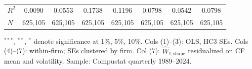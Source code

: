 \begin{table}[htbp]
{\begin{threeparttable}
\begin{tabular}{lccccccc}
$R^2$ & 0.0090 & 0.0553 & 0.1738 & 0.1196 & 0.0798 & 0.0542 & 0.0798 \\
$N$ & 625,105 & 625,105 & 625,105 & 625,105 & 625,105 & 625,105 & 625,105 \\
\bottomrule
\end{tabular}
\begin{tablenotes}
\small
\item $^{***}$, $^{**}$, $^{*}$ denote significance at 1\%, 5\%, 10\%.
Cols (1)--(3): OLS, HC3 SEs.
Cols (4)--(7): within-firm; SEs clustered by firm.
Col (7): $\widehat{W}_{1,\text{shape}}$ residualized on CF mean and volatility.
Sample: Compustat quarterly 1989--2024.
\end{tablenotes}
\end{threeparttable}
}
\end{table}
